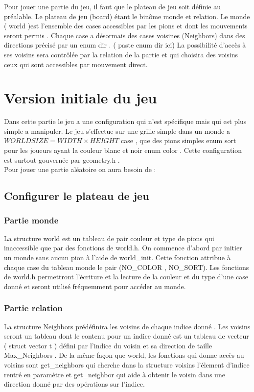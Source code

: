\documentclass[a4paper]{article}
\begin{document}
Pour jouer une partie du jeu, il faut que le plateau de jeu soit définie au préalable. Le plateau de jeu (board)  étant le binôme monde et relation. 
Le monde ( world )est l’ensemble des cases accessibles par les pions et dont les mouvements seront permis . Chaque case a désormais des cases voisines (Neighbors) dans des directions précisé par un enum dir . ( paste enum dir ici) 
La possibilité d’accès à ses voisins sera contrôlée par la relation de la partie et qui choisira des voisins ceux qui sont accessibles par mouvement direct.  
\section{Version initiale du jeu}
Dans cette partie le jeu a une configuration qui n’est spécifique mais qui est plus simple a manipuler. Le jeu s’effectue sur une grille simple dans un monde a $WORLDSIZE = WIDTH \times HEIGHT$  case , que des pions simples enum sort pour les joueurs ayant la couleur blanc et noir enum color . Cette configuration est surtout gouvernée par geometry.h . \\

Pour jouer une partie aléatoire on aura besoin de :
\subsection{Configurer le plateau de jeu}
\subsubsection{Partie monde}
La structure world est un tableau de pair couleur et type de pions qui inaccessible que par des fonctions de world.h. On commence d’abord par initier un monde sans aucun pion à l’aide de world\_init. Cette fonction attribue à chaque case du tableau monde le pair (NO\_COLOR , NO\_SORT). Les fonctions de world.h permettront l’écriture et la lecture de la couleur et du type d’une case donné et seront utilisé fréquemment pour accéder au monde.  

\subsubsection{Partie relation}
La structure Neighbors prédéfinira les voisins de chaque indice donné . Les voisins seront un tableau dont le contenu pour un indice donné est un tableau de vecteur ( struct vector t ) défini par l’indice du voisin et sa direction de taille Max\_Neighbors . De la même façon que world, les fonctions qui donne accès au voisins sont get\_neighbors qui cherche dans la structure voisins l’élement d’indice rentré en paramètre et get\_neighbor qui aide à obtenir le voisin dans une direction donné par des opérations sur l’indice.\\ 
\end{document}
